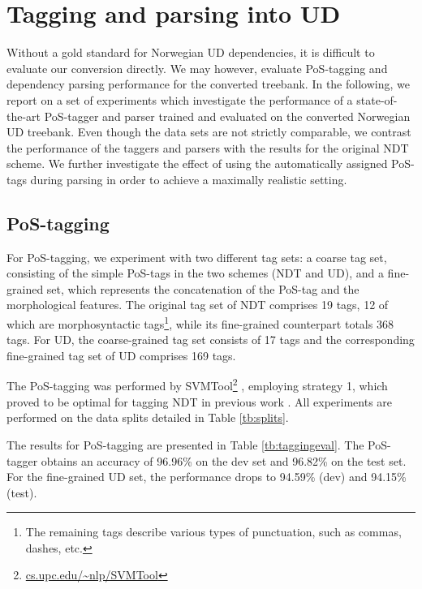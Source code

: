 \documentclass[10pt, a4paper]{article}
\begin{document}



\section{Tagging and parsing into UD}
Without a gold standard for Norwegian UD dependencies, it is difficult
to evaluate our conversion directly. We may however, evaluate
PoS-tagging and dependency parsing performance for the converted
treebank.  In the following, we report on a set of experiments which
investigate the performance of a state-of-the-art PoS-tagger and
parser trained and evaluated on the converted Norwegian UD
treebank. Even though the data sets are not strictly comparable, we
contrast the performance of the taggers and parsers with the results
for the original NDT scheme. We further investigate the effect of
using the automatically assigned PoS-tags during parsing in order to
achieve a maximally realistic setting.

\subsection{PoS-tagging}
For PoS-tagging, we experiment with two different tag sets: a coarse
tag set, consisting of the simple PoS-tags in the two schemes (NDT and
UD), and a fine-grained set, which represents the concatenation of
the PoS-tag and the morphological features. The original tag set of NDT
comprises 19 tags, 12 of which are morphosyntactic tags\footnote{The
  remaining tags describe various types of punctuation, such as
  commas, dashes, etc.}, while its fine-grained counterpart totals 368
tags. For UD, the coarse-grained tag set consists of 17 tags and the
corresponding fine-grained tag set of UD comprises 169 tags.

The PoS-tagging was performed by
SVMTool\footnote{\url{cs.upc.edu/~nlp/SVMTool}} \cite{Gim:Mar:04},
employing strategy 1, which proved to be optimal for tagging NDT in
previous work \cite{Hohle:16}. All experiments are performed on the
data splits detailed in Table \ref{tb:splits}.

The results for PoS-tagging are presented in Table
\ref{tb:taggingeval}. The PoS-tagger obtains an accuracy of 96.96\% on
the dev set and 96.82\% on the test set. For the fine-grained UD set,
the performance drops to 94.59\% (dev) and 94.15\% (test).
\end{document}

